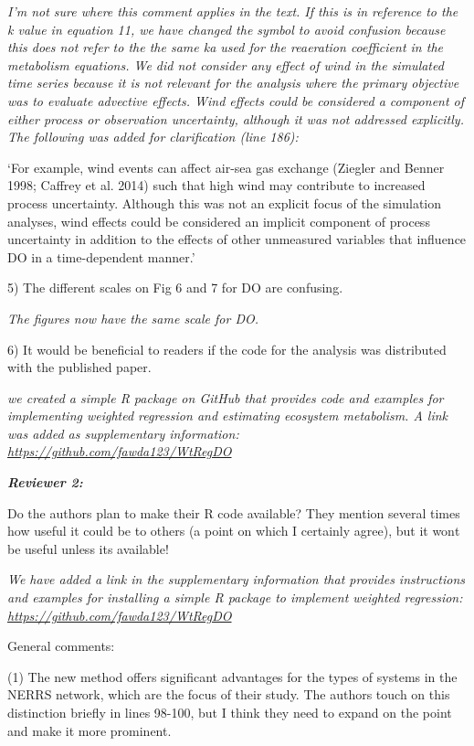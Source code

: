 \documentclass[letterpaper,12pt]{article}\usepackage[]{graphicx}\usepackage[]{color}
\newcommand{\Bigtxt}[1]{\textbf{\textit{#1}}}
\begin{document}
{\it I'm not sure where this comment applies in the text.  If this is in reference to the k value in equation 11, we have changed the symbol to avoid confusion because this does not refer to the the same ka used for the reaeration coefficient in the metabolism equations.  We did not consider any effect of wind in the simulated time series because it is not relevant for the analysis where the primary objective was to evaluate advective effects.  Wind effects could be considered a component of either process or observation uncertainty, although it was not addressed explicitly.  The following was added for clarification (line 186):

`For example, wind events can affect air-sea gas exchange (Ziegler and Benner 1998; Caffrey et al. 2014) such that high wind may contribute to increased process uncertainty.  Although this was not an explicit focus of the simulation analyses, wind effects could be considered an implicit component of process uncertainty in addition to the effects of other unmeasured variables that influence DO in a time-dependent manner.'
}

5) The different scales on Fig 6 and 7 for DO are confusing. 

{\it The figures now have the same scale for DO.}

6) It would be beneficial to readers if the code for the analysis was distributed with the published paper.

{\it we created a simple R package on GitHub that provides code and examples for implementing weighted regression and estimating ecosystem metabolism. A link was added as supplementary information: \href{https://github.com/fawda123/WtRegDO}{https://github.com/fawda123/WtRegDO}}  

\Bigtxt{Reviewer 2:}

Do the authors plan to make their R code available? They mention several times how useful it could be to others (a point on which I certainly agree), but it wont be useful unless its available!

{\it We have added a link in the supplementary information that provides instructions and examples for installing a simple R package to implement weighted regression: \href{https://github.com/fawda123/WtRegDO}{https://github.com/fawda123/WtRegDO}}

General comments:

(1) The new method offers significant advantages for the types of systems in the NERRS network, which are the focus of their study. The authors touch on this distinction briefly in lines 98-100, but I think they need to expand on the point and make it more prominent.
\end{document}
